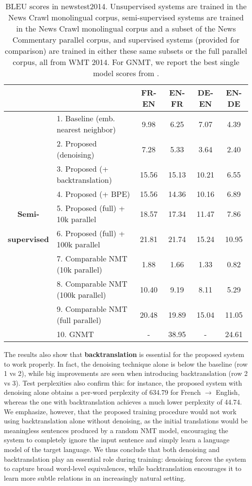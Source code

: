 \documentclass{article} \usepackage{iclr2018_conference,times}
\begin{document}
\begin{table*}[t]
\caption{BLEU scores in newstest2014. Unsupervised systems are trained in the News Crawl monolingual corpus, semi-supervised systems are trained in the News Crawl monolingual corpus and a subset of the News Commentary parallel corpus, and supervised systems (provided for comparison) are trained in either these same subsets or the full parallel corpus, all from WMT 2014. For GNMT, we report the best single model scores from \citet{wu2016google}.} \label{tab:results}
\begin{center}
  \begin{tabular}{clcccc}
    \toprule
    & & \bf FR-EN & \bf EN-FR & \bf DE-EN & \bf EN-DE \\
    \midrule
    \bf \multirow{4}{*}{Unsupervised} & 1. Baseline (emb. nearest neighbor) & 9.98 & 6.25 & 7.07 & 4.39 \\
    & 2. Proposed (denoising) & 7.28 & 5.33 & 3.64 & 2.40 \\
    & 3. Proposed (+ backtranslation) & 15.56 & 15.13 & 10.21 & 6.55 \\
    & 4. Proposed (+ BPE) & 15.56 & 14.36 & 10.16 & 6.89 \\
    \midrule
    \bf Semi- & 5. Proposed (full) + 10k parallel & 18.57 & 17.34 & 11.47 & 7.86 \\
    \bf supervised & 6. Proposed (full) + 100k parallel & 21.81 & 21.74 & 15.24 & 10.95 \\
    \midrule
    \bf \multirow{4}{*}{Supervised} & 7. Comparable NMT (10k parallel) & 1.88 & 1.66 & 1.33 & 0.82 \\
    & 8. Comparable NMT (100k parallel) & 10.40 & 9.19 & 8.11 & 5.29 \\
    & 9. Comparable NMT (full parallel) & 20.48 & 19.89 & 15.04 & 11.05 \\
    & 10. GNMT \citep{wu2016google} & - & 38.95 & - & 24.61 \\
    \bottomrule
  \end{tabular}
\end{center}
\end{table*}

The results also show that \textbf{backtranslation} is essential for the proposed system to work properly. In fact, the denoising technique alone is below the baseline (row 1 vs 2), while big improvements are seen when introducing backtranslation (row 2 vs 3). Test perplexities also confirm this: for instance, the proposed system with denoising alone obtains a per-word perplexity of 634.79 for French $\rightarrow$ English, whereas the one with backtranslation achieves a much lower perplexity of 44.74. We emphasize, however, that the proposed training procedure would not work using backtranslation alone without denoising, as the initial translations would be meaningless sentences produced by a random NMT model, encouraging the system to completely ignore the input sentence and simply learn a language model of the target language. We thus conclude that both denoising and backtranslation play an essential role during training: denoising forces the system to capture broad word-level equivalences, while backtranslation encourages it to learn more subtle relations in an increasingly natural setting.
\end{document}
